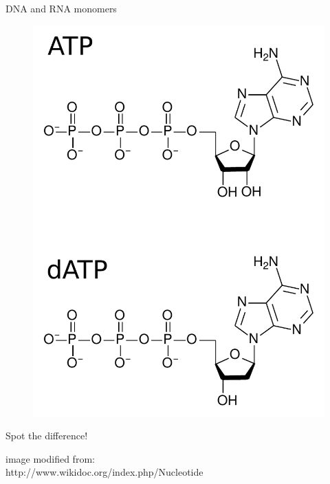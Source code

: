 \documentclass[pdf]{beamer}
\begin{document}
\begin{frame}{DNA and RNA monomers}
  \begin{figure}[ht]
    \includegraphics[height=0.7\textheight]{images/ATP_dATP}
  \end{figure}
  Spot the difference!

  {\tiny
    image modified from:\\
    http://www.wikidoc.org/index.php/Nucleotide
    \par
  }
\end{frame}
\end{document}
